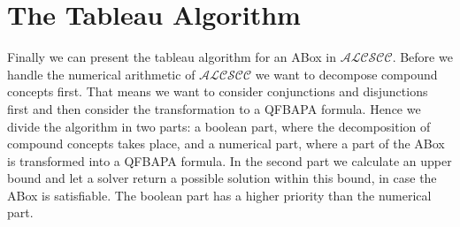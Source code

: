 \documentclass{book}
\theoremstyle{break}
\theoremstyle{definition}
\begin{document}
\section{The Tableau Algorithm}\label{Tableau}
Finally we can present the tableau algorithm for an ABox in $\mathcal{ALCSCC}$. Before we handle the numerical arithmetic of $\mathcal{ALCSCC}$ we want to decompose compound concepts first. That means we want to consider conjunctions and disjunctions first and then consider the transformation to a QFBAPA formula. Hence we divide the algorithm in two parts: a boolean part, where the decomposition of compound concepts takes place, and a numerical part, where a part of the ABox is transformed into a QFBAPA formula. In the second part we calculate an upper bound and let a solver return a possible solution within this bound, in case the ABox is satisfiable. The boolean part has a higher priority than the numerical part. 
\end{document}

